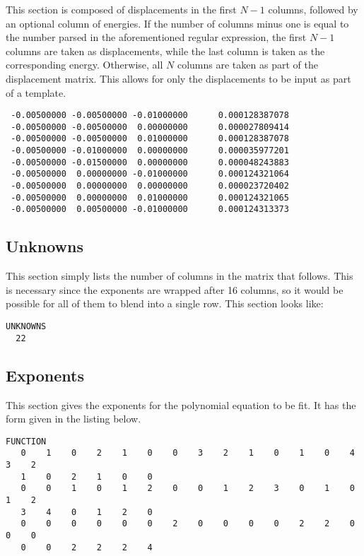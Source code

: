 \documentclass{article}
\begin{document}
This section is composed of displacements in the first $N-1$ columns, followed
by an optional column of energies. If the number of columns minus one is equal
to the number parsed in the aforementioned regular expression, the first $N-1$
columns are taken as displacements, while the last column is taken as the
corresponding energy. Otherwise, all $N$ columns are taken as part of the
displacement matrix. This allows for only the displacements to be input as part
of a template.

\begin{lstlisting}
 -0.00500000 -0.00500000 -0.01000000      0.000128387078
 -0.00500000 -0.00500000  0.00000000      0.000027809414
 -0.00500000 -0.00500000  0.01000000      0.000128387078
 -0.00500000 -0.01000000  0.00000000      0.000035977201
 -0.00500000 -0.01500000  0.00000000      0.000048243883
 -0.00500000  0.00000000 -0.01000000      0.000124321064
 -0.00500000  0.00000000  0.00000000      0.000023720402
 -0.00500000  0.00000000  0.01000000      0.000124321065
 -0.00500000  0.00500000 -0.01000000      0.000124313373
\end{lstlisting}

\subsection{Unknowns}

This section simply lists the number of columns in the matrix that follows. This
is necessary since the exponents are wrapped after 16 columns, so it would be
possible for all of them to blend into a single row. This section looks like:

\begin{lstlisting}
UNKNOWNS
  22
\end{lstlisting}

\subsection{Exponents}

This section gives the exponents for the polynomial equation to be fit. It has
the form given in the listing below.

\begin{lstlisting}
FUNCTION
   0    1    0    2    1    0    0    3    2    1    0    1    0    4    3    2
   1    0    2    1    0    0
   0    0    1    0    1    2    0    0    1    2    3    0    1    0    1    2
   3    4    0    1    2    0
   0    0    0    0    0    0    2    0    0    0    0    2    2    0    0    0
   0    0    2    2    2    4
\end{lstlisting}
\end{document}

